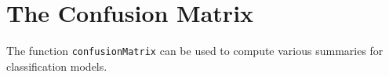 \documentclass[caret-main.tex]{subfiles}
\begin{document}
\section{The Confusion Matrix}
The function \texttt{confusionMatrix} can be used to compute various summaries for classification
models.
\end{document}
